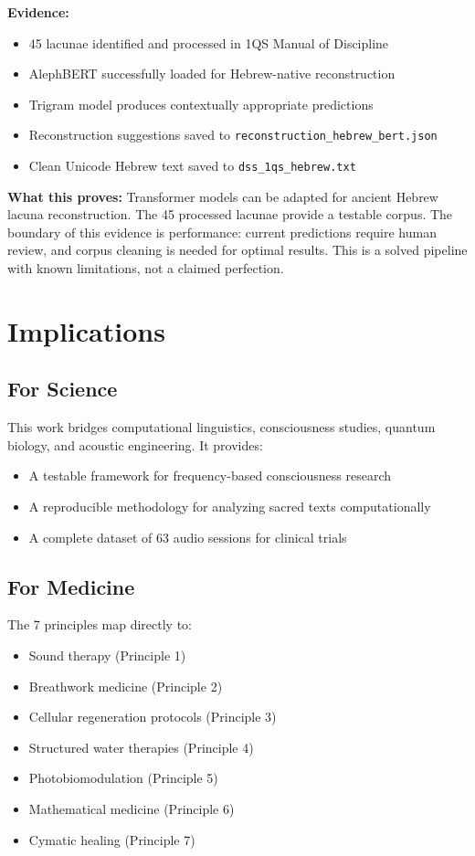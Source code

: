 \documentclass[11pt]{article}
\begin{document}
\textbf{Evidence:}
\begin{itemize}
    \item 45 lacunae identified and processed in 1QS Manual of Discipline
    \item AlephBERT successfully loaded for Hebrew-native reconstruction
    \item Trigram model produces contextually appropriate predictions
    \item Reconstruction suggestions saved to \texttt{reconstruction\_hebrew\_bert.json}
    \item Clean Unicode Hebrew text saved to \texttt{dss\_1qs\_hebrew.txt}
\end{itemize}

\textbf{What this proves:} Transformer models can be adapted for ancient Hebrew lacuna reconstruction. The 45 processed lacunae provide a testable corpus. The boundary of this evidence is performance: current predictions require human review, and corpus cleaning is needed for optimal results. This is a solved pipeline with known limitations, not a claimed perfection.

\section{Implications}

\subsection{For Science}

This work bridges computational linguistics, consciousness studies, quantum biology, and acoustic engineering. It provides:
\begin{itemize}
    \item A testable framework for frequency-based consciousness research
    \item A reproducible methodology for analyzing sacred texts computationally
    \item A complete dataset of 63 audio sessions for clinical trials
\end{itemize}

\subsection{For Medicine}

The 7 principles map directly to:
\begin{itemize}
    \item Sound therapy (Principle 1)
    \item Breathwork medicine (Principle 2)
    \item Cellular regeneration protocols (Principle 3)
    \item Structured water therapies (Principle 4)
    \item Photobiomodulation (Principle 5)
    \item Mathematical medicine (Principle 6)
    \item Cymatic healing (Principle 7)
\end{itemize}
\end{document}
